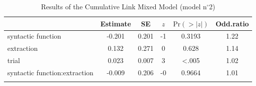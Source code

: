 \begin{table}
\begin{tabular}{l S[table-format=-1.3] S[table-format=1.3] S[table-format=-1] S[table-format=<1.4] S[table-format=1.2]}
  \lsptoprule
 & {Estimate} & {SE} & {$z$} & {$\text{Pr}(>|z|)$} & {Odd.ratio} \\ 
  \midrule
  syntactic function & -0.201 & 0.201 & -1 & 0.3193 & 1.22 \\ 
  extraction & 0.132 & 0.271 & 0 & 0.628 & 1.14 \\ 
  trial & 0.023 & 0.007 & 3 & <.005 & 1.02 \\ 
  syntactic function:extraction & -0.009 & 0.206 & -0 & 0.9664 & 1.01 \\ 
   \lspbottomrule
\end{tabular}
\caption{Results of the Cumulative Link Mixed Model (model n$^{\circ}$2)}
\label{tab:exp06-m2}
\end{table}
